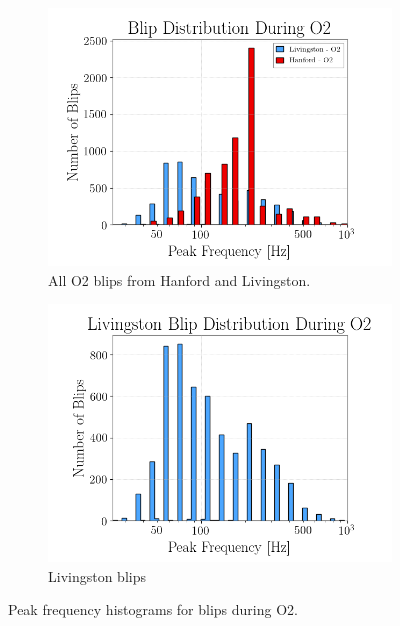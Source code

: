 \documentclass[a4paper]{article}
\begin{document}
\begin{figure}[h!]
	\centering
	\begin{subfigure}{.49\textwidth}
		\centering
		\includegraphics[width=1\linewidth]{combined_peakf}
		\caption{All O2 blips from Hanford and Livingston.}
		\label{fig:combined}
	\end{subfigure}
	\begin{subfigure}{.49\textwidth}
		\centering
		\includegraphics[width=1\linewidth]{llo_peakf}
		\caption{Livingston blips}
		\label{fig:llo_peakf}
	\end{subfigure}
	\caption{Peak frequency histograms for blips during O2.}
	\label{fig:combined_peakf}
\end{figure}
\end{document}
